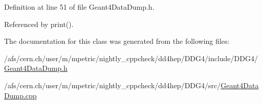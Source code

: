 Definition at line 51 of file Geant4\+Data\+Dump.\+h.



Referenced by print().



The documentation for this class was generated from the following files\+:\begin{DoxyCompactItemize}
\item 
/afs/cern.\+ch/user/m/mpetric/nightly\+\_\+cppcheck/dd4hep/\+D\+D\+G4/include/\+D\+D\+G4/\hyperlink{_geant4_data_dump_8h}{Geant4\+Data\+Dump.\+h}\item 
/afs/cern.\+ch/user/m/mpetric/nightly\+\_\+cppcheck/dd4hep/\+D\+D\+G4/src/\hyperlink{_geant4_data_dump_8cpp}{Geant4\+Data\+Dump.\+cpp}\end{DoxyCompactItemize}
